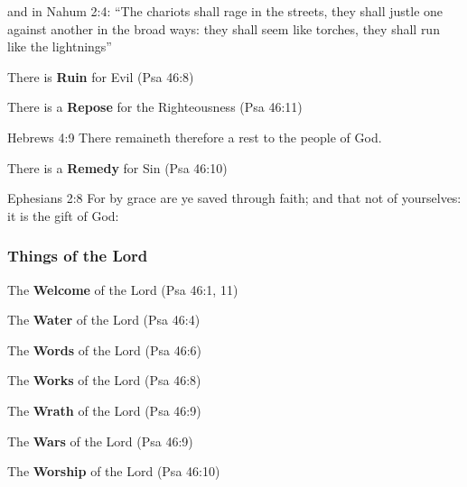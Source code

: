 \begin{compactenum}[I.][8]
\begin{compactenum}[A.]
		\item and in Nahum 2:4: ``The chariots shall rage in the streets, they shall justle one against another in the broad ways: they shall seem like torches, they shall run like the lightnings''
	\end{compactenum}
	\item There is \textbf{Ruin} for Evil (Psa 46:8)
	\item There is a \textbf{Repose} for the Righteousness (Psa 46:11)
	\begin{compactenum}[A.]
		\item Hebrews 4:9 There remaineth therefore a rest to the people of God.
	\end{compactenum}
    \item There is a \textbf{Remedy} for Sin (Psa 46:10)
	\begin{compactenum}[A.]
		\item Ephesians 2:8 For by grace are ye saved through faith; and that not of yourselves: it is the gift of God:
	\end{compactenum}
\end{compactenum}

\subsubsection{Things of the Lord}

\begin{compactenum}[I.][8]
    \item The \textbf{Welcome} of the Lord  (Psa 46:1, 11)
     \item The \textbf{Water} of the Lord  (Psa 46:4)
    \item The \textbf{Words} of the Lord  (Psa 46:6)
    \item The \textbf{Works} of the Lord  (Psa 46:8)
    \item The \textbf{Wrath} of the Lord  (Psa 46:9)
    \item The \textbf{Wars} of the Lord  (Psa 46:9)
    \item The \textbf{Worship} of the Lord  (Psa 46:10)
\end{compactenum}


